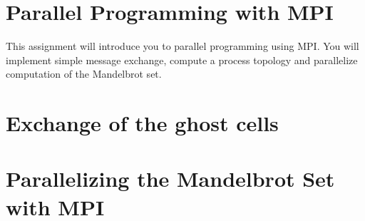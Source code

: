 \documentclass[unicode,11pt,a4paper,oneside,numbers=endperiod,openany]{scrartcl}
\begin{document}
\setassignment
{}

\newline

\section*{Parallel Programming with MPI }
This assignment will introduce you to parallel programming using MPI. You will implement simple message exchange, compute a process topology and parallelize computation of the Mandelbrot set.


\section{Exchange of the ghost cells }

\section{Parallelizing the Mandelbrot Set with MPI }
\end{document}
